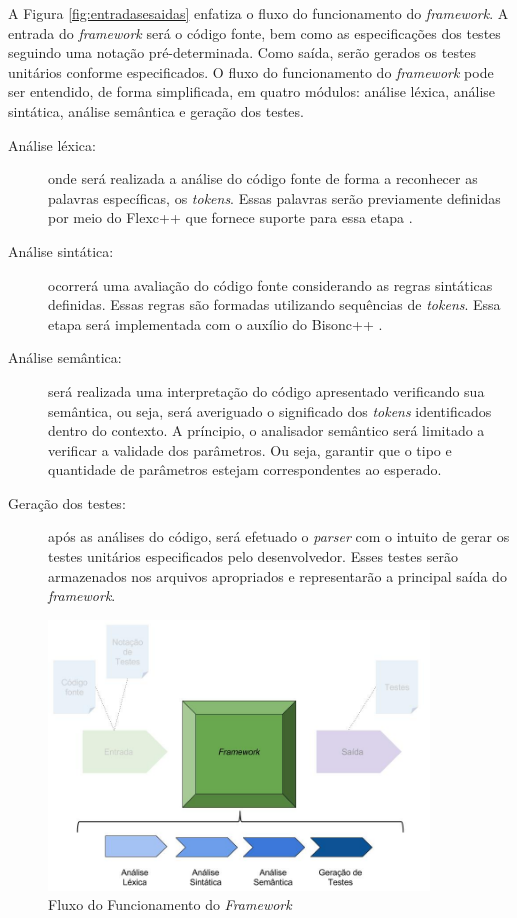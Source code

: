  \par
\indent A Figura \ref{fig:entradasesaidas} enfatiza o fluxo do funcionamento do
\textit{framework}. A entrada do \textit{framework} será o código fonte, bem
como as especificações dos testes seguindo uma notação pré-determinada. Como
saída, serão gerados os testes unitários conforme especificados. O fluxo do
funcionamento do \textit{framework} pode ser entendido, de forma simplificada,
em quatro módulos: análise léxica, análise sintática, análise semântica e
geração dos testes.
\begin{description}
  \item[Análise léxica:] onde será realizada a análise do código fonte de forma
  a reconhecer as palavras específicas, os \textit{tokens}. Essas palavras serão
  previamente definidas por meio do Flexc++ que fornece suporte para essa etapa
  \cite{flexcpp2015}.
  \item[Análise sintática:] ocorrerá uma avaliação do código fonte considerando
  as regras sintáticas definidas. Essas regras são formadas utilizando sequências
  de \textit{tokens}. Essa etapa será implementada com o auxílio do Bisonc++
  \cite{bisoncpp2015}.
  \item[Análise semântica:] será realizada uma interpretação do código apresentado
  verificando sua semântica, ou seja, será averiguado o significado dos \textit{tokens}
  identificados dentro do contexto. A príncipio, o analisador semântico será limitado
  a verificar a validade dos parâmetros. Ou seja, garantir que o tipo e quantidade
  de parâmetros estejam correspondentes ao esperado.
  \item[Geração dos testes:] após as análises do código, será efetuado o
  \textit{parser} com o intuito de gerar os testes unitários especificados pelo
  desenvolvedor. Esses testes serão armazenados nos arquivos apropriados e
  representarão a principal saída do \textit{framework}.
\end{description}

 \begin{figure}[h]
    \centering
    \includegraphics[width=0.9\textwidth]{figuras/Framework-interior (1).jpg}
    \caption{Fluxo do Funcionamento do \textit{Framework}}
    \label{fig:Framework-interior}
 \end{figure}

